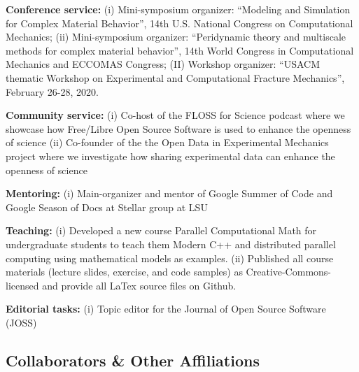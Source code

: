 \documentclass[svgnames,11pt]{article}
\begin{document}
\begin{bibenum}[itemsep=4pt]

    \item \textbf{Conference service:}
        (i) Mini-symposium organizer: ``Modeling and Simulation for Complex Material Behavior'', 14th U.S. National Congress on Computational Mechanics; (ii)  Mini-symposium organizer: ``Peridynamic theory and multiscale methods for complex material behavior'', 14th World Congress in Computational Mechanics and ECCOMAS Congress; (II) Workshop organizer: ``USACM thematic Workshop on Experimental and Computational Fracture Mechanics'', February 26-28, 2020.

 

    \item \textbf{Community service:}
        (i) Co-host of the FLOSS for Science podcast where we showcase how Free/Libre Open Source Software is used to enhance the openness of science
        (ii) Co-founder of the the Open Data in Experimental Mechanics project where we investigate how sharing experimental data can enhance the openness of science


    \item \textbf{Mentoring:}
        (i) Main-organizer and mentor of Google Summer of Code and Google Season of Docs at Stellar group at LSU
    \item \textbf{Teaching:}
    (i) Developed a new course Parallel Computational Math for undergraduate students to teach them Modern C++ and distributed parallel computing using mathematical models as examples. (ii) Published all course materials (lecture slides, exercise, and code samples) as Creative-Commons-licensed and provide all LaTex source files on Github.   
    
    \item \textbf{Editorial tasks:}
    (i) Topic editor for the Journal of Open Source Software (JOSS)
\end{bibenum}

\subsection{Collaborators \& Other Affiliations}
\end{document}
